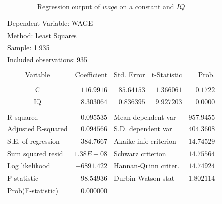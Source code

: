 \documentclass[12pt]{report}
\begin{document}
\begin{table}[H]
	\centering
	\begin{tabular}{lrrrr}
		\multicolumn{3}{l}{Dependent Variable: WAGE}&\multicolumn{1}{c}{}&\multicolumn{1}{c}{}\\
		\multicolumn{3}{l}{Method: Least Squares}&\multicolumn{1}{c}{}&\multicolumn{1}{c}{}\\
		\multicolumn{2}{l}{Sample: 1 935}&\multicolumn{1}{c}{}&\multicolumn{1}{c}{}&\multicolumn{1}{c}{}\\
		\multicolumn{3}{l}{Included observations: 935}&\multicolumn{1}{c}{}&\multicolumn{1}{c}{}\\
		[4.5pt] \hline \\ [-4.5pt]
		\multicolumn{1}{c}{Variable}&\multicolumn{1}{r}{Coefficient}&\multicolumn{1}{r}{Std. Error}&\multicolumn{1}{r}{t-Statistic}&\multicolumn{1}{r}{Prob.}\\
		[4.5pt] \hline \\ [-4.5pt]
		\multicolumn{1}{c}{C}&\multicolumn{1}{r}{$116.9916$}&\multicolumn{1}{r}{$85.64153$}&\multicolumn{1}{r}{$1.366061$}&\multicolumn{1}{r}{$0.1722$}\\
		\multicolumn{1}{c}{IQ}&\multicolumn{1}{r}{$8.303064$}&\multicolumn{1}{r}{$0.836395$}&\multicolumn{1}{r}{$9.927203$}&\multicolumn{1}{r}{$0.0000$}\\
		[4.5pt] \hline \\ [-4.5pt]
		\multicolumn{1}{l}{R-squared}&\multicolumn{1}{r}{$0.095535$}&\multicolumn{2}{l}{Mean dependent var}&\multicolumn{1}{r}{$957.9455$}\\
		\multicolumn{1}{l}{Adjusted R-squared}&\multicolumn{1}{r}{$0.094566$}&\multicolumn{2}{l}{S.D. dependent var}&\multicolumn{1}{r}{$404.3608$}\\
		\multicolumn{1}{l}{S.E. of regression}&\multicolumn{1}{r}{$384.7667$}&\multicolumn{2}{l}{Akaike info criterion}&\multicolumn{1}{r}{$14.74529$}\\
		\multicolumn{1}{l}{Sum squared resid}&\multicolumn{1}{r}{$1.38E+08$}&\multicolumn{2}{l}{Schwarz criterion}&\multicolumn{1}{r}{$14.75564$}\\
		\multicolumn{1}{l}{Log likelihood}&\multicolumn{1}{r}{$-6891.422$}&\multicolumn{2}{l}{Hannan-Quinn criter.}&\multicolumn{1}{r}{$14.74924$}\\
		\multicolumn{1}{l}{F-statistic}&\multicolumn{1}{r}{$98.54936$}&\multicolumn{2}{l}{Durbin-Watson stat}&\multicolumn{1}{r}{$1.802114$}\\
		\multicolumn{1}{l}{Prob(F-statistic)}&\multicolumn{1}{r}{$0.000000$}&\multicolumn{1}{c}{}&\multicolumn{1}{c}{}&\multicolumn{1}{c}{}\\
		[4.5pt] \hline \\ [-4.5pt]
	\end{tabular}
	\caption{Regression output of $wage$ on a constant and $IQ$}
	\label{tbl:regout1}
\end{table}
\end{document}
